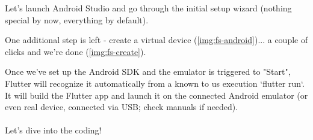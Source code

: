 Let's launch Android Studio and go through the initial setup wizard (nothing special by now, everything by default).


One additional step is left - create a virtual device (\cref{img:fs-android})... 
a couple of clicks and we're done (\cref{img:fs-create}).


Once we've set up the Android SDK and the emulator is triggered to "Start", Flutter will recognize it automatically from
a known to us execution `flutter run`. It will build the Flutter app and launch it on the connected Android 
emulator (or even real device, connected via USB; check manuals if needed).
\\
\\
Let's dive into the coding!